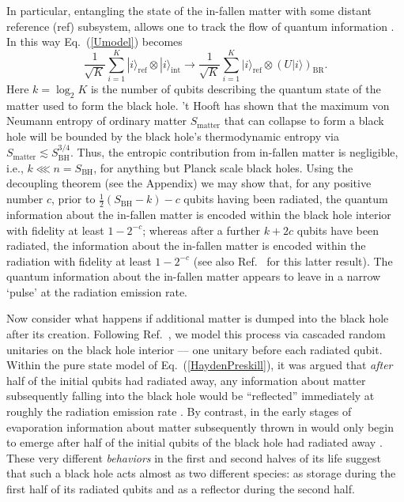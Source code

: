 \documentclass[aps,12pt]{revtex4}
\begin{document}
In particular, entangling the state of the in-fallen matter with some
distant reference (ref) subsystem, allows one to track the flow of
quantum information \cite{me,Hayden07}. In this way Eq.~(\ref{Umodel})
becomes
\begin{equation}
\frac{1}{\sqrt{K}}\sum_{i=1}^{K}
|i\rangle_{\text{ref}}\otimes|i\rangle_{\text{int}}\rightarrow
\frac{1}{\sqrt{K}}\sum_{i=1}^{K}
|i\rangle_{\text{ref}}\otimes(U|i\rangle)_{\text{BR}}.
\label{HaydenPreskill}
\end{equation}
Here $k=\log_2 K$ is the number of qubits describing the quantum state
of the matter used to form the black hole. 't Hooft \cite{tHooft93} has
shown that the maximum von Neumann entropy of ordinary matter
$S_{\text{matter}}$ that can collapse to form a black hole will be
bounded by the black hole's thermodynamic entropy via
$S_{\text{matter}}\lesssim S_{\text{BH}}^{3/4}$.
Thus, the entropic contribution from in-fallen matter is negligible,
i.e., $k\lll n=S_{\text{BH}}$, for anything but Planck scale black
holes. Using the decoupling theorem \cite{Abey06} (see the Appendix)
we may show that, for any positive number $c$, prior
to $\frac{1}{2}(S_{\text{BH}}-k)-c$ qubits having been radiated, the
quantum information about the in-fallen matter
is encoded within the black hole interior with fidelity at least
$1-2^{-c}$; whereas after a further $k + 2c$ qubits have been radiated,
the information about the in-fallen matter is encoded within the
radiation with fidelity at least $1-2^{-c}$ (see also
Ref.~ for this latter result). The quantum
information about the in-fallen matter appears to leave in a narrow
`pulse' at the radiation emission rate.

Now consider what happens if additional matter is dumped into the 
black hole after its creation. Following Ref.~, 
we model this process via cascaded random unitaries on the black hole 
interior --- one unitary before each radiated qubit. Within the pure 
state model of Eq.~(\ref{HaydenPreskill}), it was argued \cite{Hayden07} 
that {\it after\/} half of the initial qubits had radiated away, any
information about matter subsequently falling into the black hole
would be ``reflected'' immediately at roughly the radiation emission
rate \cite{Hayden07}. By contrast, in the early stages of evaporation
information about matter subsequently thrown in would only begin
to emerge after half of the initial qubits of the black hole had
radiated away \cite{Hayden07}. These very different {\it behaviors\/}
in the first and second halves of its life suggest that such a black
hole acts almost as two different species: as storage during the first
half of its radiated qubits and as a reflector during the second half.
\end{document}
